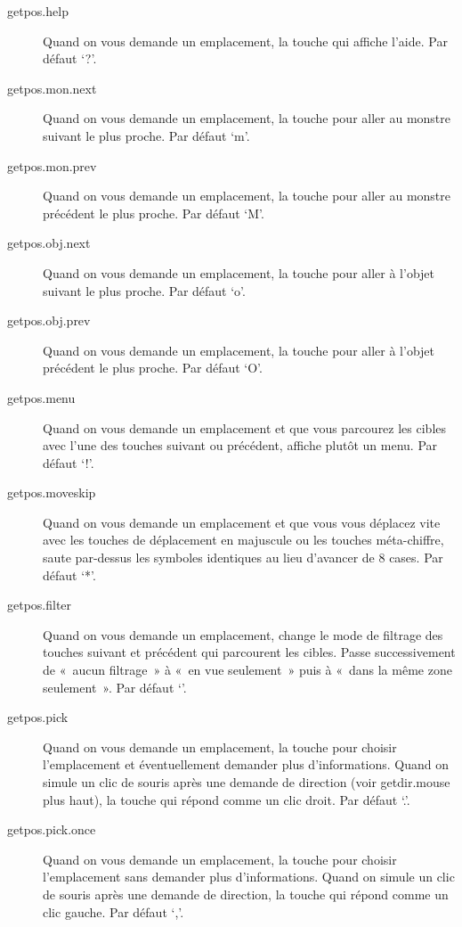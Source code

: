 \documentclass[titlepage]{article}
\begin{document}
\begin{description}
\item[{getpos.help}]
Quand on vous demande un emplacement, la touche qui affiche l'aide.
Par défaut `?'.

\item[{getpos.mon.next}]
Quand on vous demande un emplacement, la touche pour aller au monstre
suivant le plus proche.
Par défaut `m'.

\item[{getpos.mon.prev}]
Quand on vous demande un emplacement, la touche pour aller au monstre
précédent le plus proche.
Par défaut `M'.

\item[{getpos.obj.next}]
Quand on vous demande un emplacement, la touche pour aller à l'objet
suivant le plus proche.
Par défaut `o'.

\item[{getpos.obj.prev}]
Quand on vous demande un emplacement, la touche pour aller à l'objet
précédent le plus proche.
Par défaut `O'.

\item[{getpos.menu}]
Quand on vous demande un emplacement et que vous parcourez les cibles avec
l'une des touches suivant ou précédent, affiche plutôt un menu.
Par défaut `!'.

\item[{getpos.moveskip}]
Quand on vous demande un emplacement et que vous vous déplacez vite avec
les touches de déplacement en majuscule ou les touches méta-chiffre, saute
par-dessus les symboles identiques au lieu d'avancer de 8 cases.
Par défaut `*'.

\item[{getpos.filter}]
Quand on vous demande un emplacement, change le mode de filtrage des
touches suivant et précédent qui parcourent les cibles.
Passe successivement de «~aucun filtrage~» à «~en vue
seulement~» puis à «~dans la même zone seulement~».
Par défaut `\textquotedbl{}'. 

\item[{getpos.pick}]
Quand on vous demande un emplacement, la touche pour choisir l'emplacement
et éventuellement demander plus d'informations.
Quand on simule un clic de souris après une demande de direction (voir
getdir.mouse plus haut), la touche qui répond comme un clic droit.
Par défaut `.'.

\item[{getpos.pick.once}]
Quand on vous demande un emplacement, la touche pour choisir l'emplacement
sans demander plus d'informations.
Quand on simule un clic de souris après une demande de direction, la touche
qui répond comme un clic gauche.
Par défaut `,'.


\end{description}
\end{document}
